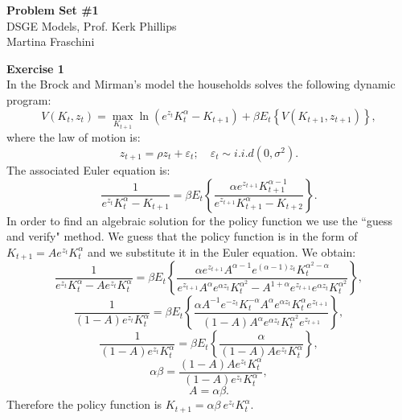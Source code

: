 \documentclass[letterpaper,12pt]{article}
\theoremstyle{definition}
\begin{document}
\begin{flushleft}
  \textbf{\large{Problem Set \#1}} \\
  DSGE Models, Prof. Kerk Phillips \\
  Martina Fraschini
\end{flushleft}

\vspace{5mm}

\noindent\textbf{Exercise 1}\\
In the Brock and Mirman's model the households solves the following dynamic program:
\[ V\left(K_{t}, z_{t}\right)=\max _{K_{t+1}} \ln \left(e^{z_{t}} K_{t}^{\alpha}-K_{t+1}\right)+\beta E_{t}\left\{V\left(K_{t+1}, z_{t+1}\right)\right\}, \]
where the law of motion is:
\[ z_{t+1}=\rho z_{t}+\varepsilon_{t} ; \quad \varepsilon_{t} \sim i . i . d\left(0, \sigma^{2}\right). \]
The associated Euler equation is:
\[ \frac{1}{e^{z_{t}} K_{t}^{\alpha}-K_{t+1}}=\beta E_{t}\left\{\frac{\alpha e^{z_{t+1}} K_{t+1}^{\alpha-1}}{e^{z_{t+1}} K_{t+1}^{\alpha}-K_{t+2}}\right\}. \]
In order to find an algebraic solution for the policy function we use the ``guess and verify" method. We guess that the policy function is in the form of $K_{t+1}=A e^{z_{t}} K_{t}^{\alpha}$ and we substitute it in the Euler equation. We obtain:
\[ \frac{1}{e^{z_{t}} K_{t}^{\alpha}-A e^{z_{t}} K_{t}^{\alpha}}=\beta E_{t}\left\{\frac{\alpha e^{z_{t+1}} A^{\alpha-1} e^{(\alpha-1)z_{t}} K_{t}^{\alpha^2-\alpha}}{e^{z_{t+1}} A^\alpha e^{\alpha z_{t}} K_{t}^{\alpha^2}-A^{1+\alpha} e^{z_{t+1}}e^{\alpha z_{t}} K_{t}^{\alpha^2}}\right\}, \]
\[ \frac{1}{(1-A) e^{z_{t}} K_{t}^{\alpha}}=\beta E_{t}\left\{\frac{\alpha A^{-1}e^{-z_t} K_t^{-\alpha} A^\alpha e^{\alpha z_{t}} K_{t}^\alpha e^{z_{t+1}}}{(1-A)A^\alpha e^{\alpha z_{t}} K_{t}^{\alpha^2}e^{z_{t+1}}}\right\}, \]
\[ \frac{1}{(1-A) e^{z_{t}} K_{t}^{\alpha}}=\beta E_{t}\left\{\frac{\alpha}{(1-A)A e^{z_{t}} K_{t}^{\alpha}}\right\}, \]
\[ \alpha\beta=\frac{(1-A)A e^{z_{t}} K_{t}^{\alpha}}{(1-A) e^{z_{t}} K_{t}^{\alpha}}, \]
\[ A=\alpha\beta. \]
Therefore the policy function is $K_{t+1}=\alpha\beta~ e^{z_{t}} K_{t}^{\alpha}$.\\
\end{document}
